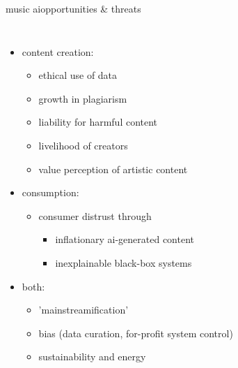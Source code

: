 \begin{frame}{music ai}{opportunities \& threats}
\begin{columns}
        \begin{itemize}
            \item<2-> content creation:
                \begin{itemize}
                    \item ethical use of data
                    \item growth in plagiarism
                    \item liability for harmful content
                    \item livelihood of  creators
                    \item value perception of artistic content
                \end{itemize}
            \smallskip
            \item<2-> consumption:
                \begin{itemize}
                    \item consumer distrust through 
                        \begin{itemize}
                            \item inflationary ai-generated content
                            \item inexplainable black-box systems
                        \end{itemize}
                \end{itemize}
            \item<2-> both:
                \begin{itemize}
                    \item 'mainstreamification'
                    \item bias (data curation, for-profit system control)
                    \item sustainability and energy 
                \end{itemize}
        \end{itemize}
    \end{columns}
\end{frame}




